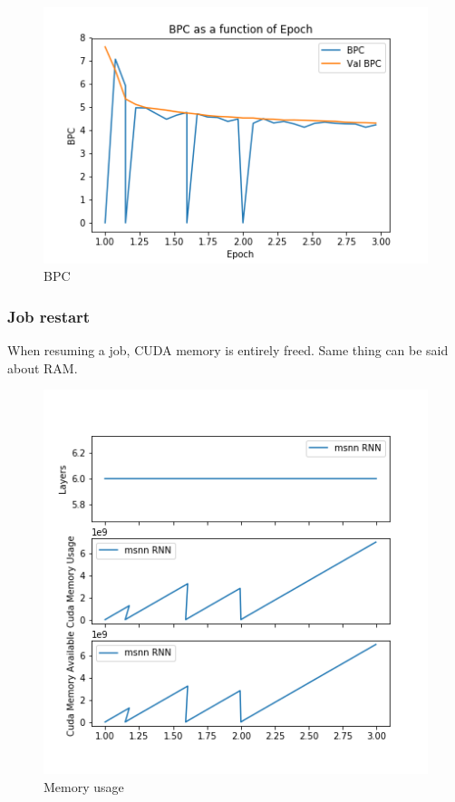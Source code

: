 \begin{figure}[H]
\centering
\includegraphics[width=\textwidth]{parts/appendix/reports-gmsnn/docs_esteban-latex/test_reports/2018-06-11/frac_val_bpc.png}
\caption{BPC}
\end{figure}


\newpage
\subsubsection{Job restart}\label{job-restart}

When resuming a job, CUDA memory is entirely freed. Same thing can be
said about RAM.

\begin{figure}[H]
\centering
\includegraphics[width=\textwidth]{parts/appendix/reports-gmsnn/docs_esteban-latex/test_reports/2018-06-11/memory.png}
\caption{Memory usage}
\end{figure}

